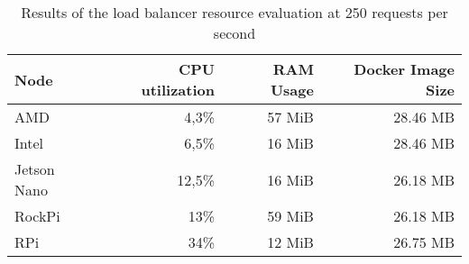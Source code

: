 \begin{table}[]
\begin{tabular}{lrrr}
\hline
\textbf{Node} & \textbf{CPU utilization} & \textbf{RAM Usage} & \textbf{Docker Image Size} \\ \hline
AMD           & 4,3\%                    & 57 MiB             & 28.46 MB                   \\
Intel         & 6,5\%                    & 16 MiB             & 28.46 MB                   \\
Jetson Nano   & 12,5\%                   & 16 MiB             & 26.18 MB                   \\
RockPi        & 13\%                     & 59 MiB             & 26.18 MB                   \\
RPi           & 34\%                     & 12 MiB             & 26.75 MB                  
\end{tabular}
\caption{Results of the load balancer resource evaluation at 250 requests per second}
\label{tab:resource_eval_results}
\end{table}